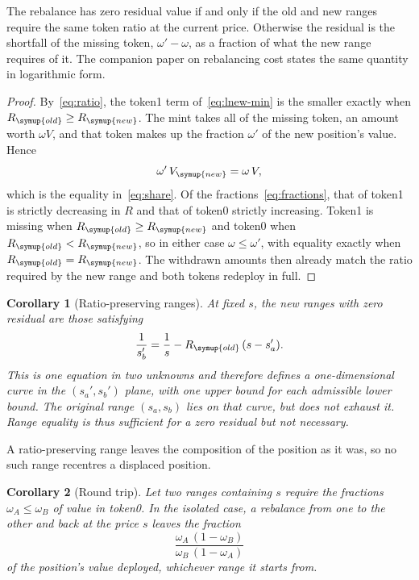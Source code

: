 \documentclass[11pt,a4paper]{article}
\theoremstyle{siphon}
\newtheorem{corollary}{Corollary}[theorem]
\renewcommand\qedsymbol{\raisebox{0.17ex}{\scalebox{0.68}{\ensuremath{\mdlgblksquare}}}}
\begin{document}
\noindent The rebalance has zero residual value if and only if the old and new ranges require the same token ratio at the current price. Otherwise the residual is the shortfall of the missing token, $\omega' - \omega$, as a fraction of what the new range requires of it. The companion paper on rebalancing cost states the same quantity in logarithmic form.\cite{ryan2026localtime}

\begin{proof}\renewcommand\qedsymbol{\smash{{\normalfont\qedface\fontsize{12.5pt}{12.5pt}\selectfont\scshape\addfontfeatures{LetterSpace=7}q.e.d.}}}
By~\eqref{eq:ratio}, the token1 term of~\eqref{eq:lnew-min} is the smaller exactly when $R_{\symup{old}} \geq R_{\symup{new}}$. The mint takes all of the missing token, an amount worth $\omega V$, and that token makes up the fraction $\omega'$ of the new position's value. Hence
\[
\omega'\,V_{\symup{new}} = \omega\,V ,
\]
which is the equality in~\eqref{eq:share}. Of the fractions~\eqref{eq:fractions}, that of token1 is strictly decreasing in $R$ and that of token0 strictly increasing. Token1 is missing when $R_{\symup{old}} \geq R_{\symup{new}}$ and token0 when $R_{\symup{old}} < R_{\symup{new}}$, so in either case $\omega \leq \omega'$, with equality exactly when $R_{\symup{old}} = R_{\symup{new}}$. The withdrawn amounts then already match the ratio required by the new range and both tokens redeploy in full.
\end{proof}
\vspace{9pt}

\begin{corollary}[Ratio-preserving ranges]\label{cor:locus}
At fixed $s$, the new ranges with zero residual are those satisfying
\[
\frac{1}{s_b'} = \frac{1}{s} - R_{\symup{old}}\,(s - s_a') .
\]
This is one equation in two unknowns and therefore defines a one-dimensional curve in the $(s_a', s_b')$ plane, with one upper bound for each admissible lower bound. The original range $(s_a, s_b)$ lies on that curve, but does not exhaust it. Range equality is thus sufficient for a zero residual but not necessary.
\end{corollary}

\noindent A ratio-preserving range leaves the composition of the position as it was, so no such range recentres a displaced position.

\begin{corollary}[Round trip]\label{cor:roundtrip}
Let two ranges containing $s$ require the fractions $\omega_A \leq \omega_B$ of value in token0. In the isolated case, a rebalance from one to the other and back at the price $s$ leaves the fraction
\[
\frac{\omega_A\,(1 - \omega_B)}{\omega_B\,(1 - \omega_A)}
\]
of the position's value deployed, whichever range it starts from.
\end{corollary}
\end{document}
